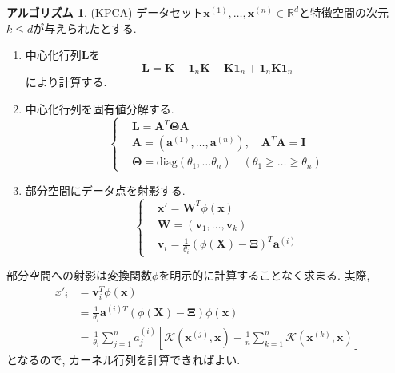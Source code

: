 \documentclass[uplatex]{jsarticle}
\theoremstyle{definition}
\newtheorem{algorithm}[definition]{アルゴリズム}
\numberwithin{equation}{section}
\newcommand{\R}{\mathbb{R}}
\begin{document}
\begin{algorithm}
    (KPCA)
    データセット$\bm{x}^{(1)}, \dots, \bm{x}^{(n)} \in \R^{d}$と特徴空間の次元$k \leq d$が与えられたとする.
    \begin{enumerate}
        \item
        中心化行列$\bm{L}$を
        \begin{equation}
            \bm{L} = \bm{K} - \bm{1}_{n}\bm{K} - \bm{K}\bm{1}_{n} + \bm{1}_{n}\bm{K}\bm{1}_{n}
        \end{equation}
        により計算する.

        \item
        中心化行列を固有値分解する.
        \begin{equation}
            \left\{
            \begin{aligned}
                &\bm{L} = \bm{A}^{T}\bm{\Theta}\bm{A} \\
                &\bm{A} = (\bm{a}^{(1)}, \dots, \bm{a}^{(n)}), \quad \bm{A}^{T}\bm{A} = \bm{I} \\
                &\bm{\Theta} = \mathrm{diag}(\theta_{1}, \dots \theta_{n}) \quad (\theta_{1} \geq \dots \geq \theta_{n})
            \end{aligned}
            \right.
        \end{equation}

        \item
        部分空間にデータ点を射影する.
        \begin{equation}
            \left\{
            \begin{aligned}
                &\bm{x}' = \bm{W}^{T}\phi(\bm{x}) \\
                &\bm{W} = (\bm{v}_{1}, \dots, \bm{v}_{k}) \\
                &\bm{v}_{i} = \frac{1}{\theta_{i}}(\phi(\bm{X}) - \bm{\Xi})^{T}\bm{a}^{(i)}
            \end{aligned}
            \right.
        \end{equation}
    \end{enumerate}

部分空間への射影は変換関数$\phi$を明示的に計算することなく求まる.
実際, 
\begin{align*}
    x'_{i}
    &= \bm{v}_{i}^{T}\phi(\bm{x}) \\
    &= \frac{1}{\theta_{i}}\bm{a}^{(i)T}(\phi(\bm{X}) - \bm{\Xi})\phi(\bm{x}) \\
    &= \frac{1}{\theta_{i}}\sum_{j = 1}^{n} a^{(i)}_{j}\left[\mathcal{K}(\bm{x}^{(j)}, \bm{x}) - \frac{1}{n}\sum_{k = 1}^{n} \mathcal{K}(\bm{x}^{(k)}, \bm{x})\right]
\end{align*}
となるので, カーネル行列を計算できればよい.
\end{algorithm}
\end{document}
